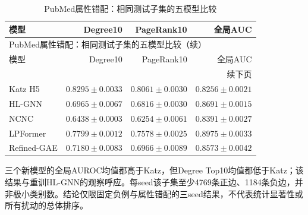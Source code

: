 \documentclass[UTF8,a4paper,11pt,fontset=fandol]{ctexart}
\begin{document}
{\footnotesize
\setlength{\tabcolsep}{3pt}
\begin{longtable}{lrrr}
\caption{PubMed属性错配：相同测试子集的五模型比较}\\
\toprule
模型 & Degree10 & PageRank10 & 全局AUC \\
\midrule
\endfirsthead
\multicolumn{4}{l}{PubMed属性错配：相同测试子集的五模型比较（续）}\\
\toprule
模型 & Degree10 & PageRank10 & 全局AUC \\
\midrule
\endhead
\midrule\multicolumn{4}{r}{续下页}\\
\endfoot
\bottomrule\endlastfoot
Katz H5 & $0.8295\pm0.0033$ & $0.8061\pm0.0030$ & $0.8256\pm0.0021$ \\
HL-GNN & $0.6965\pm0.0067$ & $0.6816\pm0.0030$ & $0.8691\pm0.0015$ \\
NCNC & $0.6438\pm0.0003$ & $0.6254\pm0.0061$ & $0.8391\pm0.0027$ \\
LPFormer & $0.7799\pm0.0012$ & $0.7578\pm0.0025$ & $0.8975\pm0.0033$ \\
Refined-GAE & $0.7180\pm0.0083$ & $0.6966\pm0.0089$ & $0.8573\pm0.0042$ \\
\end{longtable}
}
三个新模型的全局AUROC均值都高于Katz，但Degree Top10均值都低于Katz；该结果与重训HL-GNN的观察呼应。每seed该子集至少4769条正边、1184条负边，并非极小类别数。结论仅限固定负例与属性错配的三seed结果，不代表统计显著性或所有扰动的总体排序。
\end{document}
